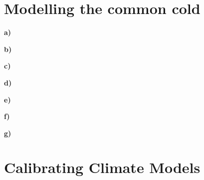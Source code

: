 \documentclass[11pt, a4paper, english]{NTNUoving}
\begin{document}
\section*{Modelling the common cold}
\textbf{a)}

\textbf{b)}

\textbf{c)}

\textbf{d)}

\textbf{e)}

\textbf{f)}

\textbf{g)}



\section*{Calibrating Climate Models}
\end{document}
